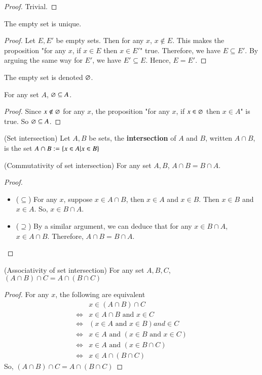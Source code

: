 \begin{proof}
    Trivial.
\end{proof}
\begin{prop}
    The empty set is unique. 
\end{prop}
\begin{proof}
    Let $E,E'$ be empty sets. Then for any $x$, $x\not\in E$. This makes the proposition "for any $x$, if $x\in E$ then $x\in E'$" true. Therefore, we have $E\subseteq E'$. By arguing the same way for $E'$, we have $E'\subseteq E$. Hence, $E= E'$.
\end{proof}
\begin{rem}
    The empty set is denoted $\varnothing$.
\end{rem}
\begin{prop}
    For any set $A$, $\varnothing\subseteq A$.
\end{prop}
\begin{proof}
    Since $x\not\in\varnothing$ for any $x$, the proposition "for any $x$, if $x\in \varnothing$ then $x\in A$" is true. So $\varnothing\subseteq A$.
\end{proof}
\begin{defn}
    (Set intersection) Let $A,B$ be sets, the \textbf{intersection} of $A$ and $B$, written $A\cap B$, is the set $A\cap B:= \{x\in A|x\in B\}$
\end{defn}
\begin{prop}
    (Commutativity of set intersection) For any set $A,B$, $A\cap B = B\cap A$.
\end{prop}
\begin{proof}
    ~
    \begin{itemize}
        \item ($\subseteq$) For any $x$, suppose $x\in A\cap B$, then $x\in A$ and $x\in B$. Then $x\in B$ and $x\in A$. So, $x\in B\cap A$.
        \item ($\supseteq$) By a similar argument, we can deduce that for any $x\in B\cap A$, $x\in A\cap B$.
        Therefore, $A\cap B = B\cap A$.
    \end{itemize}
\end{proof}
\begin{prop}
    (Associativity of set intersection) For any set $A,B,C$, $(A\cap B)\cap C = A\cap (B \cap C)$
\end{prop}
\begin{proof}
    For any $x$, the following are equivalent 
    \begin{align*}
        & x\in (A\cap B) \cap C\\
        \Leftrightarrow & x\in A\cap B \text{ and } x\in C\\
        \Leftrightarrow & (x\in A\text{ and } x\in B) and \in C\\
        \Leftrightarrow & x\in A \text{ and }(x\in B\text{ and  }x\in C)\\
        \Leftrightarrow & x\in A \text{ and }(x\in B\cap C)\\
        \Leftrightarrow & x\in A\cap(B\cap C)
    \end{align*}
    So, $(A\cap B)\cap C = A\cap(B\cap C)$
\end{proof}

